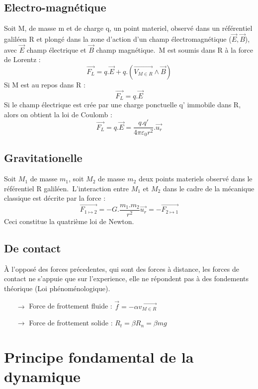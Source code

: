 \subsection{Electro-magnétique}
Soit M, de masse m et de charge q, un point materiel, observé dans un référentiel galiléen R et plongé dans la zone d'action d'un champ électromagnétique ($\overrightarrow{E},\overrightarrow{B}$), avec $\overrightarrow{E}$ champ électrique et $\overrightarrow{B}$ champ magnétique.\
M est soumis dans R à la force de Lorentz :
$$\overrightarrow{F_L} = q.\overrightarrow{E} + q.(\overrightarrow{V_{M \in R}}\wedge\overrightarrow{B})$$
Si M est au repos dans R :
$$\overrightarrow{F_L} = q.\overrightarrow{E}$$
Si le champ électrique est crée par une charge ponctuelle q' immobile dans R, alors on obtient la loi de Coulomb : 
$$\overrightarrow{F_L} = q.\overrightarrow{E} = \dfrac{q.q'}{4\pi\varepsilon_0r^2}.\overrightarrow{u_r}$$
\subsection{Gravitationelle}
Soit $M_1$ de masse $m_1$, soit $M_2$ de masse $m_2$ deux points materiels observé dans le référentiel R galiléen.\
L'interaction entre $M_1$ et $M_2$ dans le cadre de la mécanique classique est décrite par la force :
$$\overrightarrow{F_{1 \mapsto 2}} = -G.\dfrac{m_1.m_2}{r^2}\overrightarrow{u_r} = -\overrightarrow{F_{2 \mapsto 1}}$$
Ceci constitue la quatrième loi de Newton.
\subsection{De contact}
À l'opposé des forces précedentes, qui sont des forces à distance, les forces de contact ne s'appuie que sur l'experience, elle ne répondent pas à des fondements théorique (Loi phénoménologique).
\begin{itemize}
 \item[$\rightarrow$] Force de frottement fluide : $\overrightarrow{f}=-\alpha \overrightarrow{v_{M \in R}}$
 \item[$\rightarrow$] Force de frottement solide : $R_t = \beta R_n = \beta mg$
\end{itemize}
\section{Principe fondamental de la dynamique}
